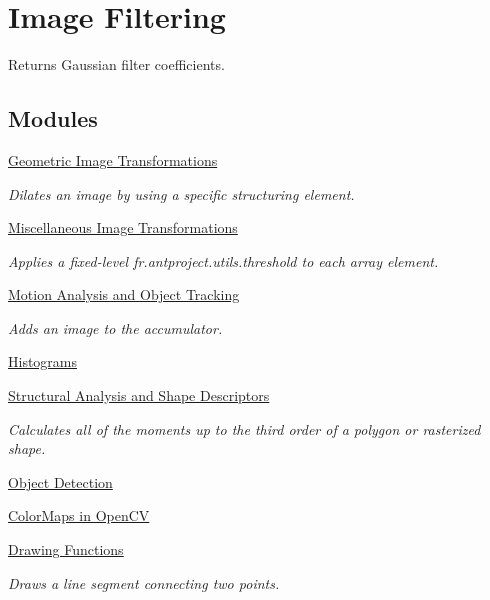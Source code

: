 \hypertarget{group__imgproc__filter}{}\section{Image Filtering}
\label{group__imgproc__filter}


Returns Gaussian filter coefficients.  


\subsection*{Modules}
\begin{DoxyCompactItemize}
\item 
\hyperlink{group__imgproc__transform}{Geometric Image Transformations}
\begin{DoxyCompactList}\small\item\em Dilates an image by using a specific structuring element. \end{DoxyCompactList}\item 
\hyperlink{group__imgproc__misc}{Miscellaneous Image Transformations}
\begin{DoxyCompactList}\small\item\em Applies a fixed-\/level fr.antproject.utils.threshold to each array element. \end{DoxyCompactList}\item
\hyperlink{group__imgproc__motion}{Motion Analysis and Object Tracking}
\begin{DoxyCompactList}\small\item\em Adds an image to the accumulator. \end{DoxyCompactList}\item 
\hyperlink{group__imgproc__hist}{Histograms}
\item 
\hyperlink{group__imgproc__shape}{Structural Analysis and Shape Descriptors}
\begin{DoxyCompactList}\small\item\em Calculates all of the moments up to the third order of a polygon or rasterized shape. \end{DoxyCompactList}\item 
\hyperlink{group__imgproc__object}{Object Detection}
\item 
\hyperlink{group__imgproc__colormap}{Color\+Maps in Open\+CV}
\item 
\hyperlink{group__imgproc__draw}{Drawing Functions}
\begin{DoxyCompactList}\small\item\em Draws a line segment connecting two points. \end{DoxyCompactList}\end{DoxyCompactItemize}
